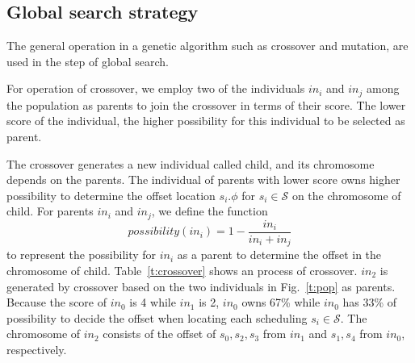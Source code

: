 \documentclass[journal]{IEEEtran}
\newcommand{\calS}{\mathcal{S}}
\theoremstyle{remark}
\begin{document}
\subsection{Global search strategy \label{s:glo}}

The general operation in a genetic algorithm such as crossover and mutation,
  are used in the step of global search. 

For operation of crossover,
 we employ two of the individuals $in_i$ and $in_j$ among the population as parents to join the crossover in terms of their score.
The lower score of the individual,
 the higher possibility for this individual to be selected as parent.
 
The crossover generates a new individual called child, and its chromosome depends on the parents.
The individual of parents with lower score owns higher possibility to determine the offset location $s_i.\phi$ for $s_i\in\calS$ on the chromosome of child.
For parents $in_i$ and $in_j$, we define the function
\begin{equation}
	possibility(in_i)=1-\frac{in_i}{in_i+in_j}
\end{equation}
to represent the possibility for $in_i$ as a parent to determine the offset in the chromosome of child.
Table~\ref{t:crossover} shows an process of crossover.
$in_2$ is generated by crossover based on the two individuals in Fig.~\ref{t:pop} as parents.
Because the score of $in_0$ is 4 while $in_1$ is 2,
 $in_0$ owns 67\% while $in_0 $ has 33\% of possibility to decide the offset when locating each scheduling $s_i\in\calS$.
The chromosome of $in_2$ consists of the offset of $s_0,s_2,s_3$ from $in_1$ and $s_1,s_4$ from $in_0$, respectively.
\end{document}
